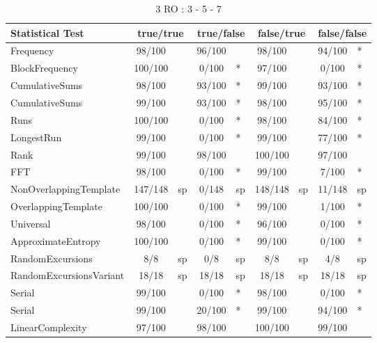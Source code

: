 \begin{table}[H]
\centering
\caption{3 RO : 3 - 5 - 7}
\label{tab:nist_22_3RO_15I}
\begin{tabular}{|l|c|l|c|l|c|l|c|l|}
\hline
\textbf{Statistical Test} & \multicolumn{2}{c|}{\textbf{true/true}} & \multicolumn{2}{c|}{\textbf{true/false}} & \multicolumn{2}{c|}{\textbf{false/true}} & \multicolumn{2}{c|}{\textbf{false/false}} \\ \hline
Frequency               &  98/100 &     &  96/100 &     &  98/100 &     &  94/100 & *   \\ \hline
BlockFrequency          & 100/100 &     &   0/100 & *   &  97/100 &     &   0/100 & *   \\ \hline
CumulativeSums          &  98/100 &     &  93/100 & *   &  99/100 &     &  93/100 & *   \\ \hline
CumulativeSums          &  99/100 &     &  93/100 & *   &  98/100 &     &  95/100 & *   \\ \hline
Runs                    & 100/100 &     &   0/100 & *   &  98/100 &     &  84/100 & *   \\ \hline
LongestRun              &  99/100 &     &   0/100 & *   &  99/100 &     &  77/100 & *   \\ \hline
Rank                    &  99/100 &     &  98/100 &     & 100/100 &     &  97/100 &     \\ \hline
FFT                     &  98/100 &     &   0/100 & *   &  99/100 &     &   7/100 & *   \\ \hline
NonOverlappingTemplate  & 147/148 & sp  &   0/148 & sp  & 148/148 & sp  &  11/148 & sp  \\ \hline
OverlappingTemplate     & 100/100 &     &   0/100 & *   &  99/100 &     &   1/100 & *   \\ \hline
Universal               &  98/100 &     &   0/100 & *   &  96/100 &     &   0/100 & *   \\ \hline
ApproximateEntropy      & 100/100 &     &   0/100 & *   &  99/100 &     &   0/100 & *   \\ \hline
RandomExcursions        &     8/8 & sp  &     0/8 & sp  &     8/8 & sp  &     4/8 & sp  \\ \hline
RandomExcursionsVariant &   18/18 & sp  &   18/18 & sp  &   18/18 & sp  &   18/18 & sp  \\ \hline
Serial                  &  99/100 &     &   0/100 & *   &  98/100 &     &   0/100 & *   \\ \hline
Serial                  &  99/100 &     &  20/100 & *   &  99/100 &     &  94/100 & *   \\ \hline
LinearComplexity        &  97/100 &     &  98/100 &     & 100/100 &     &  99/100 &     \\ \hline
\end{tabular}
\end{table}

